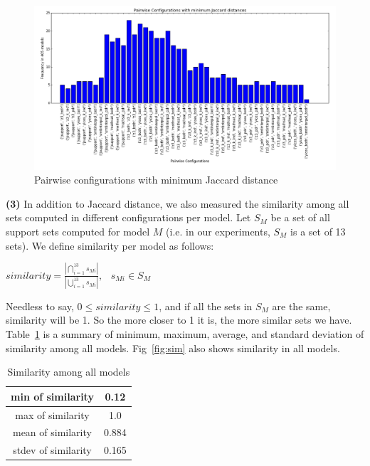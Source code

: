 \begin{figure}
  \centering
  \includegraphics[width=\textwidth]{figs/min_settings_analyses.png}
  \caption{Pairwise configurations with minimum Jaccard distance}\label{fig:mindis}
\end{figure}


\noindent{}
 \vspace{9pt}

\textbf{(3)} In addition to Jaccard distance, we also measured the similarity among all sets computed in different configurations per model. Let $S_M$ be a set of all support sets computed for model $M$ (i.e. in our experiments, $S_M$ is a set of 13 sets).  We define similarity per model as follows:

\begin{center}
$similarity = \frac{|\bigcap_{i=1}^{13} s_{Mi}|}{|\bigcup_{i=1}^{13} s_{Mi}|}, \hspace{9pt} s_{Mi} \in S_M$
\end{center}
\vspace{6pt} 

Needless to say, $0 \leq similarity \leq 1$, and if all the sets in $S_M$ are the same, similarity will be 1. So the more closer to 1 it is, the more similar sets we have. Table~\ref{tab:sim} is a summary of minimum, maximum, average, and standard deviation of similarity among all models. Fig~\ref{fig:sim} also shows similarity in all models.

\begin{table}
  \centering
  \begin{tabular}{ |c|c|}
    \hline
     min of similarity& 0.12 \\[0.5ex]
     \hline
     max of similarity& 1.0\\[0.5ex]
     \hline
     mean of similarity & 0.884\\[0.5ex]
     \hline
     stdev of similarity & 0.165\\[0.5ex]
    \hline
  \end{tabular}
  \caption{\small{Similarity among all models}}
  \label{tab:sim}
\end{table}

